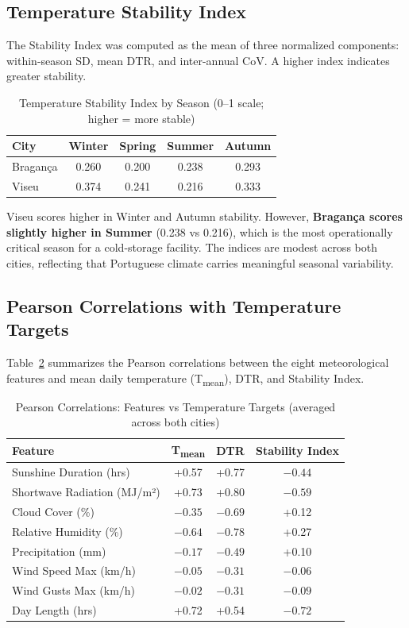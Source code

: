 \documentclass[11pt,a4paper]{article}
\begin{document}
\subsection{Temperature Stability Index}

The Stability Index was computed as the mean of three normalized components: within-season SD, mean DTR, and inter-annual CoV. A higher index indicates greater stability.

\begin{table}[H]
\centering
\caption{Temperature Stability Index by Season (0–1 scale; higher = more stable)}
\label{tab:stability}
\begin{tabular}{lcccc}
\toprule
\textbf{City} & \textbf{Winter} & \textbf{Spring} & \textbf{Summer} & \textbf{Autumn} \\
\midrule
Bragança & 0.260 & 0.200 & 0.238 & 0.293 \\
Viseu    & 0.374 & 0.241 & 0.216 & 0.333 \\
\bottomrule
\end{tabular}
\end{table}

Viseu scores higher in Winter and Autumn stability. However, \textbf{Bragança scores slightly higher in Summer} (0.238 vs 0.216), which is the most operationally critical season for a cold-storage facility. The indices are modest across both cities, reflecting that Portuguese climate carries meaningful seasonal variability.

\subsection{Pearson Correlations with Temperature Targets}

Table~\ref{tab:corr} summarizes the Pearson correlations between the eight meteorological features and mean daily temperature (T\textsubscript{mean}), DTR, and Stability Index.

\begin{table}[H]
\centering
\caption{Pearson Correlations: Features vs Temperature Targets (averaged across both cities)}
\label{tab:corr}
\begin{tabular}{lccc}
\toprule
\textbf{Feature} & \textbf{T\textsubscript{mean}} & \textbf{DTR} & \textbf{Stability Index} \\
\midrule
Sunshine Duration (hrs) & +0.57 & +0.77 & $-0.44$ \\
Shortwave Radiation (MJ/m²) & +0.73 & +0.80 & $-0.59$ \\
Cloud Cover (\%) & $-0.35$ & $-0.69$ & +0.12 \\
Relative Humidity (\%) & $-0.64$ & $-0.78$ & +0.27 \\
Precipitation (mm) & $-0.17$ & $-0.49$ & +0.10 \\
Wind Speed Max (km/h) & $-0.05$ & $-0.31$ & $-0.06$ \\
Wind Gusts Max (km/h) & $-0.02$ & $-0.31$ & $-0.09$ \\
Day Length (hrs) & +0.72 & +0.54 & $-0.72$ \\
\bottomrule
\end{tabular}
\end{table}
\end{document}
